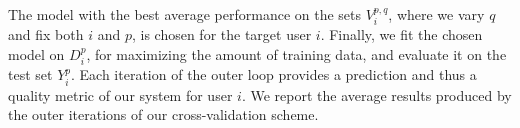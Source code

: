 \documentclass[letterpaper]{article} %
\theoremstyle{definition}
\newcommand{\argmax}[1]{\underset{#1}{\operatorname{arg}\,\operatorname{max}}\;}
\newcommand{\kibitz}[2]{\ifnum\Comments=1{\color{#1}{#2}}\fi}
\newcommand{\ym}[1]{\kibitz{blue}{[YM:#1]}}
\begin{document}
The model with the best average performance on the sets $V_i^{p,q}$, where we vary $q$ and fix both $i$ and $p$, is chosen for the target user $i$.
Finally, we fit the chosen model on $D_i^p$, for maximizing the amount of training data, and evaluate it on the test set $Y_i^p$.
Each iteration of the outer loop provides a prediction and thus a quality metric of our system for user $i$.
We report the average results produced by the outer iterations of our cross-validation scheme.

% 
%

  
\end{document}
